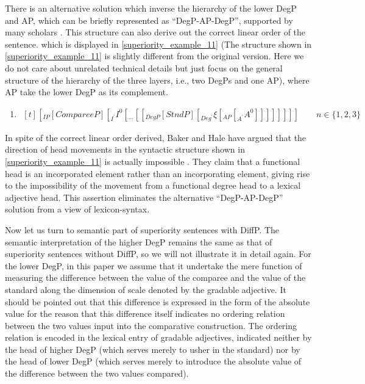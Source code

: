 \documentclass{ctexart}
\let \cite \parencite
\begin{document}
There is an alternative solution which inverse the hierarchy of the lower DegP and AP, which can be briefly represented as ``DegP-AP-DegP'', supported by many scholars \cite{xiang2005,grano2012}. This structure can also derive out the correct linear order of the sentence. which is displayed in \ref{superiority_example_11} (The structure shown in \ref{superiority_example_11} is slightly different from the original version. Here we do not care about unrelated technical details but just focus on the general structure of the hierarchy of the three layers, i.e., two DegPs and one AP), where AP take the lower DegP as its complement.

\begin{enumerate}
    \item \label{superiority_example_11}
    $\begin{aligned}[t]
        [_{IP} [CompareeP] [_{I^{\prime}} I^{0} [_{...} [[_{DegP} [StndP] [_{Deg^{\prime}} \xi [_{AP} [_{A^{\prime}} A^{0}]]]]]]]] \qquad n \in \{1, 2, 3\}
    \end{aligned}$
\end{enumerate}

In spite of the correct linear order derived, Baker and Hale have argued that the direction of head movements in the syntactic structure shown in \ref{superiority_example_11} is actually impossible \cite{baker1988incorporation,hale1993argument}. They claim that a functional head is an incorporated element rather than an incorporating element, giving rise to the impossibility of the movement from a functional degree head to a lexical adjective head. This assertion eliminates the alternative ``DegP-AP-DegP'' solution from a view of lexicon-syntax.

Now let us turn to semantic part of superiority sentences with DiffP. The semantic interpretation of the higher DegP remains the same as that of superiority sentences without DiffP, so we will not illustrate it in detail again. For the lower DegP, in this paper we assume that it undertake the mere function of measuring the difference between the value of the comparee and the value of  the standard along the dimension of scale denoted by the gradable adjective. It should be pointed out that this difference is expressed in the form of the absolute value for the reason that this difference itself indicates no ordering relation between the two values input into the comparative construction.  The ordering relation is encoded in the lexical entry of gradable adjectives,  indicated neither by the head of higher DegP (which serves merely to usher in the standard) nor by the head of lower DegP (which serves merely to introduce the absolute value of the difference between the two values compared). 
\end{document}
